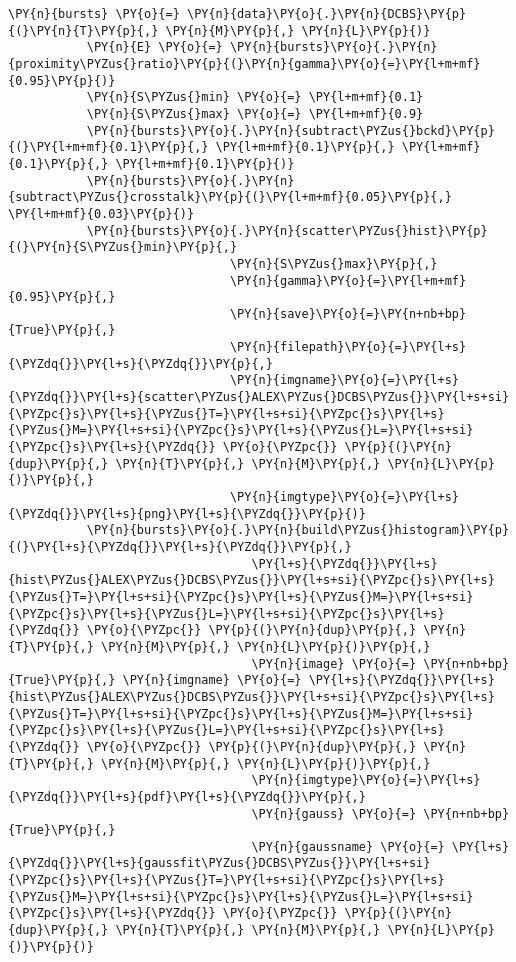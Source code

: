 \begin{Verbatim}[commandchars=\\\{\}, fontsize=\scriptsize]
           \PY{n}{bursts} \PY{o}{=} \PY{n}{data}\PY{o}{.}\PY{n}{DCBS}\PY{p}{(}\PY{n}{T}\PY{p}{,} \PY{n}{M}\PY{p}{,} \PY{n}{L}\PY{p}{)}
           \PY{n}{E} \PY{o}{=} \PY{n}{bursts}\PY{o}{.}\PY{n}{proximity\PYZus{}ratio}\PY{p}{(}\PY{n}{gamma}\PY{o}{=}\PY{l+m+mf}{0.95}\PY{p}{)}
           \PY{n}{S\PYZus{}min} \PY{o}{=} \PY{l+m+mf}{0.1}
           \PY{n}{S\PYZus{}max} \PY{o}{=} \PY{l+m+mf}{0.9}
           \PY{n}{bursts}\PY{o}{.}\PY{n}{subtract\PYZus{}bckd}\PY{p}{(}\PY{l+m+mf}{0.1}\PY{p}{,} \PY{l+m+mf}{0.1}\PY{p}{,} \PY{l+m+mf}{0.1}\PY{p}{,} \PY{l+m+mf}{0.1}\PY{p}{)}
           \PY{n}{bursts}\PY{o}{.}\PY{n}{subtract\PYZus{}crosstalk}\PY{p}{(}\PY{l+m+mf}{0.05}\PY{p}{,} \PY{l+m+mf}{0.03}\PY{p}{)}
           \PY{n}{bursts}\PY{o}{.}\PY{n}{scatter\PYZus{}hist}\PY{p}{(}\PY{n}{S\PYZus{}min}\PY{p}{,} 
                               \PY{n}{S\PYZus{}max}\PY{p}{,} 
                               \PY{n}{gamma}\PY{o}{=}\PY{l+m+mf}{0.95}\PY{p}{,} 
                               \PY{n}{save}\PY{o}{=}\PY{n+nb+bp}{True}\PY{p}{,} 
                               \PY{n}{filepath}\PY{o}{=}\PY{l+s}{\PYZdq{}}\PY{l+s}{\PYZdq{}}\PY{p}{,} 
                               \PY{n}{imgname}\PY{o}{=}\PY{l+s}{\PYZdq{}}\PY{l+s}{scatter\PYZus{}ALEX\PYZus{}DCBS\PYZus{}}\PY{l+s+si}{\PYZpc{}s}\PY{l+s}{\PYZus{}T=}\PY{l+s+si}{\PYZpc{}s}\PY{l+s}{\PYZus{}M=}\PY{l+s+si}{\PYZpc{}s}\PY{l+s}{\PYZus{}L=}\PY{l+s+si}{\PYZpc{}s}\PY{l+s}{\PYZdq{}} \PY{o}{\PYZpc{}} \PY{p}{(}\PY{n}{dup}\PY{p}{,} \PY{n}{T}\PY{p}{,} \PY{n}{M}\PY{p}{,} \PY{n}{L}\PY{p}{)}\PY{p}{,} 
                               \PY{n}{imgtype}\PY{o}{=}\PY{l+s}{\PYZdq{}}\PY{l+s}{png}\PY{l+s}{\PYZdq{}}\PY{p}{)}
           \PY{n}{bursts}\PY{o}{.}\PY{n}{build\PYZus{}histogram}\PY{p}{(}\PY{l+s}{\PYZdq{}}\PY{l+s}{\PYZdq{}}\PY{p}{,} 
                                  \PY{l+s}{\PYZdq{}}\PY{l+s}{hist\PYZus{}ALEX\PYZus{}DCBS\PYZus{}}\PY{l+s+si}{\PYZpc{}s}\PY{l+s}{\PYZus{}T=}\PY{l+s+si}{\PYZpc{}s}\PY{l+s}{\PYZus{}M=}\PY{l+s+si}{\PYZpc{}s}\PY{l+s}{\PYZus{}L=}\PY{l+s+si}{\PYZpc{}s}\PY{l+s}{\PYZdq{}} \PY{o}{\PYZpc{}} \PY{p}{(}\PY{n}{dup}\PY{p}{,} \PY{n}{T}\PY{p}{,} \PY{n}{M}\PY{p}{,} \PY{n}{L}\PY{p}{)}\PY{p}{,} 
                                  \PY{n}{image} \PY{o}{=} \PY{n+nb+bp}{True}\PY{p}{,} \PY{n}{imgname} \PY{o}{=} \PY{l+s}{\PYZdq{}}\PY{l+s}{hist\PYZus{}ALEX\PYZus{}DCBS\PYZus{}}\PY{l+s+si}{\PYZpc{}s}\PY{l+s}{\PYZus{}T=}\PY{l+s+si}{\PYZpc{}s}\PY{l+s}{\PYZus{}M=}\PY{l+s+si}{\PYZpc{}s}\PY{l+s}{\PYZus{}L=}\PY{l+s+si}{\PYZpc{}s}\PY{l+s}{\PYZdq{}} \PY{o}{\PYZpc{}} \PY{p}{(}\PY{n}{dup}\PY{p}{,} \PY{n}{T}\PY{p}{,} \PY{n}{M}\PY{p}{,} \PY{n}{L}\PY{p}{)}\PY{p}{,} 
                                  \PY{n}{imgtype}\PY{o}{=}\PY{l+s}{\PYZdq{}}\PY{l+s}{pdf}\PY{l+s}{\PYZdq{}}\PY{p}{,} 
                                  \PY{n}{gauss} \PY{o}{=} \PY{n+nb+bp}{True}\PY{p}{,} 
                                  \PY{n}{gaussname} \PY{o}{=} \PY{l+s}{\PYZdq{}}\PY{l+s}{gaussfit\PYZus{}DCBS\PYZus{}}\PY{l+s+si}{\PYZpc{}s}\PY{l+s}{\PYZus{}T=}\PY{l+s+si}{\PYZpc{}s}\PY{l+s}{\PYZus{}M=}\PY{l+s+si}{\PYZpc{}s}\PY{l+s}{\PYZus{}L=}\PY{l+s+si}{\PYZpc{}s}\PY{l+s}{\PYZdq{}} \PY{o}{\PYZpc{}} \PY{p}{(}\PY{n}{dup}\PY{p}{,} \PY{n}{T}\PY{p}{,} \PY{n}{M}\PY{p}{,} \PY{n}{L}\PY{p}{)}\PY{p}{)}
\end{Verbatim}
